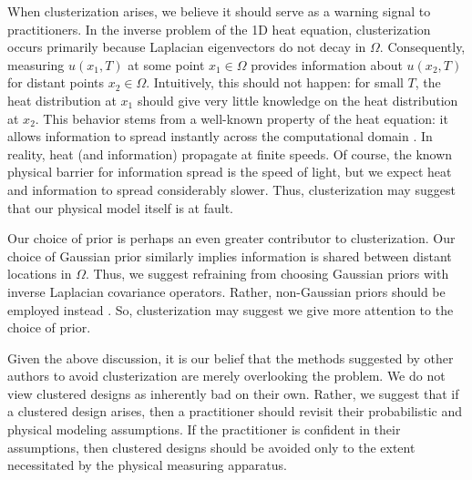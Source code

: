 When clusterization arises, we believe it should serve as a warning
signal to practitioners. In the inverse problem of the 1D heat
equation, clusterization occurs primarily because Laplacian
eigenvectors do not decay in $\Omega$. Consequently, measuring $u(x_1,
T)$ at some point $x_1 \in \Omega$ provides information about
$u(x_2,T)$ for distant points $x_2 \in \Omega$. Intuitively, this
should not happen: for small $T$, the heat distribution at $x_1$
should give very little knowledge on the heat distribution at
$x_2$. This behavior stems from a well-known property of the heat
equation: it allows information to spread instantly across the
computational domain \cite{renardy2006PDE}. In reality, heat (and
information) propagate at finite speeds. Of course, the known physical
barrier for information spread is the speed of light, but we expect
heat and information to spread considerably slower. Thus,
clusterization may suggest that our physical model itself is at fault.


Our choice of prior is perhaps an even greater contributor to
clusterization. Our choice of Gaussian prior similarly implies
information is shared between distant locations in $\Omega$. Thus, we
suggest refraining from choosing Gaussian priors with inverse
Laplacian covariance operators. Rather, non-Gaussian priors should be
employed instead \cite{hosseini2017, hosseini2019}. So, clusterization
may suggest we give more attention to the choice of prior.

Given the above discussion, it is our belief that the methods
suggested by other authors to avoid clusterization are merely
overlooking the problem. We do not view clustered designs as
inherently bad on their own. Rather, we suggest that if a clustered
design arises, then a practitioner should revisit their probabilistic
and physical modeling assumptions. If the practitioner is confident in
their assumptions, then clustered designs should be avoided only to
the extent necessitated by the physical measuring apparatus.

